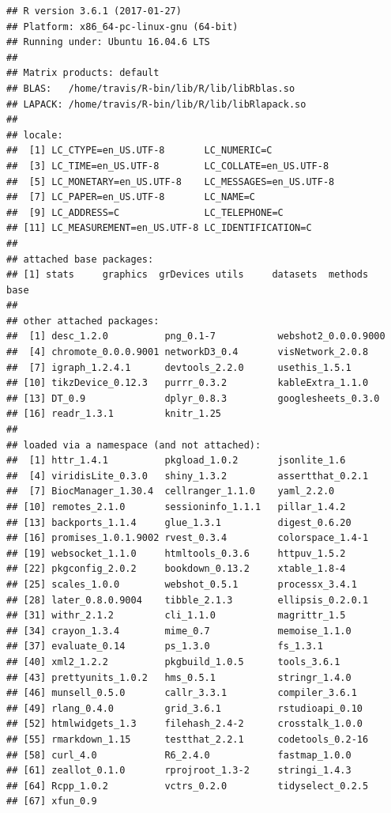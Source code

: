 \documentclass[]{article}
\begin{document}
\begin{verbatim}
## R version 3.6.1 (2017-01-27)
## Platform: x86_64-pc-linux-gnu (64-bit)
## Running under: Ubuntu 16.04.6 LTS
## 
## Matrix products: default
## BLAS:   /home/travis/R-bin/lib/R/lib/libRblas.so
## LAPACK: /home/travis/R-bin/lib/R/lib/libRlapack.so
## 
## locale:
##  [1] LC_CTYPE=en_US.UTF-8       LC_NUMERIC=C              
##  [3] LC_TIME=en_US.UTF-8        LC_COLLATE=en_US.UTF-8    
##  [5] LC_MONETARY=en_US.UTF-8    LC_MESSAGES=en_US.UTF-8   
##  [7] LC_PAPER=en_US.UTF-8       LC_NAME=C                 
##  [9] LC_ADDRESS=C               LC_TELEPHONE=C            
## [11] LC_MEASUREMENT=en_US.UTF-8 LC_IDENTIFICATION=C       
## 
## attached base packages:
## [1] stats     graphics  grDevices utils     datasets  methods   base     
## 
## other attached packages:
##  [1] desc_1.2.0          png_0.1-7           webshot2_0.0.0.9000
##  [4] chromote_0.0.0.9001 networkD3_0.4       visNetwork_2.0.8   
##  [7] igraph_1.2.4.1      devtools_2.2.0      usethis_1.5.1      
## [10] tikzDevice_0.12.3   purrr_0.3.2         kableExtra_1.1.0   
## [13] DT_0.9              dplyr_0.8.3         googlesheets_0.3.0 
## [16] readr_1.3.1         knitr_1.25         
## 
## loaded via a namespace (and not attached):
##  [1] httr_1.4.1          pkgload_1.0.2       jsonlite_1.6       
##  [4] viridisLite_0.3.0   shiny_1.3.2         assertthat_0.2.1   
##  [7] BiocManager_1.30.4  cellranger_1.1.0    yaml_2.2.0         
## [10] remotes_2.1.0       sessioninfo_1.1.1   pillar_1.4.2       
## [13] backports_1.1.4     glue_1.3.1          digest_0.6.20      
## [16] promises_1.0.1.9002 rvest_0.3.4         colorspace_1.4-1   
## [19] websocket_1.1.0     htmltools_0.3.6     httpuv_1.5.2       
## [22] pkgconfig_2.0.2     bookdown_0.13.2     xtable_1.8-4       
## [25] scales_1.0.0        webshot_0.5.1       processx_3.4.1     
## [28] later_0.8.0.9004    tibble_2.1.3        ellipsis_0.2.0.1   
## [31] withr_2.1.2         cli_1.1.0           magrittr_1.5       
## [34] crayon_1.3.4        mime_0.7            memoise_1.1.0      
## [37] evaluate_0.14       ps_1.3.0            fs_1.3.1           
## [40] xml2_1.2.2          pkgbuild_1.0.5      tools_3.6.1        
## [43] prettyunits_1.0.2   hms_0.5.1           stringr_1.4.0      
## [46] munsell_0.5.0       callr_3.3.1         compiler_3.6.1     
## [49] rlang_0.4.0         grid_3.6.1          rstudioapi_0.10    
## [52] htmlwidgets_1.3     filehash_2.4-2      crosstalk_1.0.0    
## [55] rmarkdown_1.15      testthat_2.2.1      codetools_0.2-16   
## [58] curl_4.0            R6_2.4.0            fastmap_1.0.0      
## [61] zeallot_0.1.0       rprojroot_1.3-2     stringi_1.4.3      
## [64] Rcpp_1.0.2          vctrs_0.2.0         tidyselect_0.2.5   
## [67] xfun_0.9
\end{verbatim}
\end{document}
